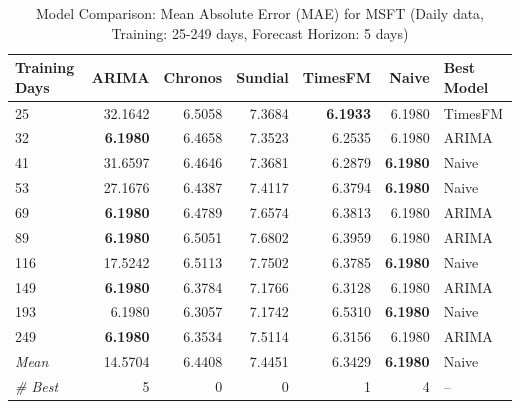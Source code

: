 \begin{table}[htbp]
\centering
\caption{Model Comparison: Mean Absolute Error (MAE) for MSFT (Daily data, Training: 25-249 days, Forecast Horizon: 5 days)}
\label{tab:comparison_MSFT_1d_train-less-year-log_h5_MAE}
\small
\begin{tabular}{lrrrrrl}
\toprule
Training Days & ARIMA & Chronos & Sundial & TimesFM & Naive & Best Model \\
\midrule
25 & 32.1642 & 6.5058 & 7.3684 & \textbf{6.1933} & 6.1980 & TimesFM \\
32 & \textbf{6.1980} & 6.4658 & 7.3523 & 6.2535 & 6.1980 & ARIMA \\
41 & 31.6597 & 6.4646 & 7.3681 & 6.2879 & \textbf{6.1980} & Naive \\
53 & 27.1676 & 6.4387 & 7.4117 & 6.3794 & \textbf{6.1980} & Naive \\
69 & \textbf{6.1980} & 6.4789 & 7.6574 & 6.3813 & 6.1980 & ARIMA \\
89 & \textbf{6.1980} & 6.5051 & 7.6802 & 6.3959 & 6.1980 & ARIMA \\
116 & 17.5242 & 6.5113 & 7.7502 & 6.3785 & \textbf{6.1980} & Naive \\
149 & \textbf{6.1980} & 6.3784 & 7.1766 & 6.3128 & 6.1980 & ARIMA \\
193 & 6.1980 & 6.3057 & 7.1742 & 6.5310 & \textbf{6.1980} & Naive \\
249 & \textbf{6.1980} & 6.3534 & 7.5114 & 6.3156 & 6.1980 & ARIMA \\
\midrule
\textit{Mean} & 14.5704 & 6.4408 & 7.4451 & 6.3429 & \textbf{6.1980} & Naive \\
\textit{\# Best} & 5 & 0 & 0 & 1 & 4 & -- \\
\bottomrule
\end{tabular}
\end{table}
